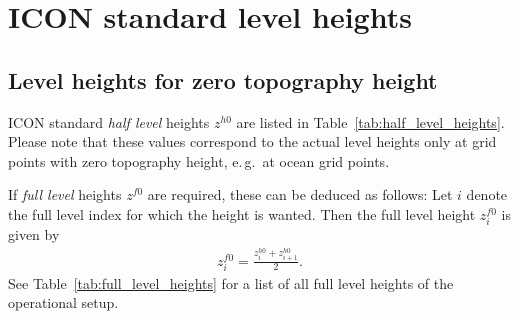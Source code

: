 \chapter{ICON standard level heights}
\label{appendix_levelheights}


\section{Level heights for zero topography height}

ICON standard \emph{half level} heights $z^{h0}$ are listed in
Table~\ref{tab:half_level_heights}.
%
Please note that these values correspond to the actual level heights only
at grid points with zero topography height, e.\,g.\ at ocean grid points.

If \emph{full level} heights $z^{f0}$ are required, these can be deduced as
follows:
%
Let $i$ denote the full level index for which the height is wanted. Then the full level 
height $z^{f0}_{i}$ is given by
\begin{align*}
 z^{f0}_{i} = \frac{ z^{h0}_{i} + z^{h0}_{i+1} }{2}.
\end{align*}
See Table~\ref{tab:full_level_heights} for a list of all full level heights of the operational
setup.


